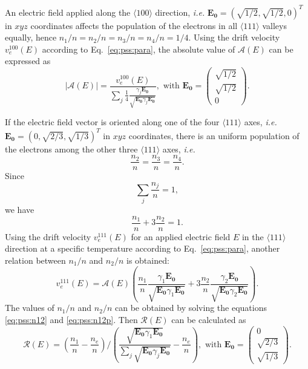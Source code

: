 An electric field applied along the $\langle 100 \rangle$ direction,
\textit{i.e.} $\mathbf{E_{0}} = (\sqrt{1/2}, \sqrt{1/2}, 0)^{T}$ in
$xyz$ coordinates affects the population of the electrons in all
$\langle 111 \rangle$ valleys equally, hence $n_{1}/n = n_{2}/n =
n_{3}/n = n_{4}/n = 1/4$. Using the drift velocity $v_{e}^{100}(E)$
according to Eq.~\ref{eq:pss:para}, the absolute value of
$\mathcal{A}(E)$ can be expressed as
\begin{equation} 
\label{eq:pss:ae} 
|\mathcal{A}(E)| = \frac{v_{e}^{100}(E)}  {\displaystyle \sum_{j} \frac{1}{4} \frac{\gamma_{j}\mathbf{E_{0}}} {\sqrt{\mathbf{E_{0}}\gamma_{j}\mathbf{E_{0}}}}}, \mbox{ with } \mathbf{E_{0}} = \left( \begin{array}{c}  
\sqrt{1/2}\\\sqrt{1/2}\\0 \end{array} \right). 
\end{equation} 
 
If the electric field vector is oriented along one of the four
$\langle 111 \rangle$ axes, \textit{i.e.} $\mathbf{E_{0}} = (0,
\sqrt{2/3}, \sqrt{1/3})^{T}$ in $xyz$ coordinates, there is an uniform
population of the electrons among the other three $\langle 111
\rangle$ axes, \textit{i.e.}
\begin{equation} 
\label{eq:pss:n111} 
\frac{n_{2}}{n} = \frac{n_{3}}{n} = \frac{n_{4}}{n}. 
\end{equation} 
Since 
\begin{equation} 
\label{eq:pss:nsum} 
\displaystyle \sum_{j}\frac{n_{j}}{n} = 1, 
\end{equation} 
we have 
\begin{equation} 
\label{eq:pss:n12} 
\frac{n_{1}}{n} + 3\frac{n_{2}}{n}= 1. 
\end{equation} 
Using the drift velocity $v_{e}^{111}(E)$ for an applied electric
field $E$ in the $\langle 111 \rangle$ direction at a specific
temperature according to Eq.~\ref{eq:pss:para}, another relation
between $n_{1}/n$ and $n_{2}/n$ is obtained:
\begin{equation} 
\label{eq:pss:n12p} 
v_{e}^{111}(E) =  \mathcal{A}(E) \left(  \frac{n_{1}}{n} \frac{\gamma_{1}\mathbf{E_{0}}}         {\sqrt{\mathbf{E_{0}}\gamma_{1}\mathbf{E_{0}}}} +  3\frac{n_{2}}{n} \frac{\gamma_{2}\mathbf{E_{0}}}         {\sqrt{\mathbf{E_{0}}\gamma_{2}\mathbf{E_{0}}}} \right). 
\end{equation} 
The values of $n_{1}/n$ and $n_{2}/n$ can be obtained by solving the
equations \ref{eq:pss:n12} and \ref{eq:pss:n12p}. Then
$\mathcal{R}(E)$ can be calculated as
\begin{equation} 
\label{eq:pss:re} 
\mathcal{R}(E) = \left( \frac{n_{1}}{n} - \frac{n_{e}}{n} \right) / \left( \frac{\sqrt{\mathbf{E_{0}}\gamma_{1}\mathbf{E_{0}}}} 
{\sum_{j}\sqrt{\mathbf{E_{0}}\gamma_{j}\mathbf{E_{0}}}} - \frac{n_{e}}{n} \right), \mbox{ with } \mathbf{E_{0}} = \left( \begin{array}{c}  
0\\ \sqrt{2/3}\\\sqrt{1/3} \end{array} \right). 
\end{equation} 
 
